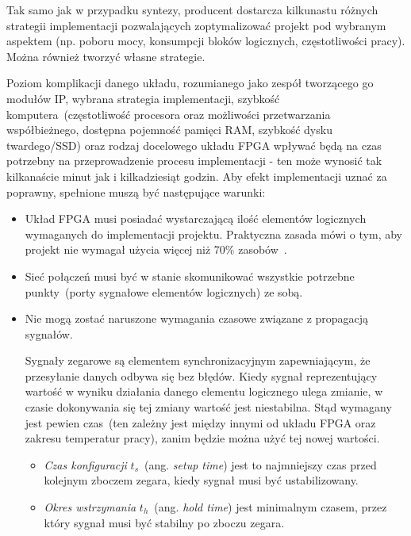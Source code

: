 Tak samo jak w przypadku syntezy, producent dostarcza kilkunastu różnych strategii implementacji pozwalających zoptymalizować projekt pod wybranym aspektem (np. poboru mocy, konsumpcji bloków logicznych, częstotliwości pracy). Można również tworzyć własne strategie.

Poziom komplikacji danego układu, rozumianego jako zespół tworzącego go modułów IP, wybrana strategia implementacji, szybkość komputera~(częstotliwość procesora oraz możliwości przetwarzania współbieżnego, dostępna pojemność pamięci RAM, szybkość dysku twardego/SSD) oraz rodzaj docelowego układu FPGA wpływać będą na czas potrzebny na przeprowadzenie procesu implementacji - ten może wynosić tak kilkanaście minut jak i kilkadziesiąt godzin. Aby efekt implementacji uznać za poprawny, spełnione muszą być następujące warunki:
\begin{itemize}
\item Układ FPGA musi posiadać wystarczającą ilość elementów logicznych wymaganych do implementacji projektu. Praktyczna zasada mówi o tym, aby projekt nie wymagał użycia więcej niż 70\% zasobów~\cite{Designing_with_Xilinx}.
\item Sieć połączeń musi być w stanie skomunikować wszystkie potrzebne punkty~(porty sygnałowe elementów logicznych) ze sobą. 
\item Nie mogą zostać naruszone wymagania czasowe związane z propagacją sygnałów. 

Sygnały zegarowe są elementem synchronizacyjnym zapewniającym, że przesyłanie danych odbywa się bez błędów. Kiedy sygnał reprezentujący wartość w wyniku działania danego elementu logicznego ulega zmianie, w czasie dokonywania się tej zmiany wartość jest niestabilna. Stąd wymagany jest pewien czas~(ten zależny jest między innymi od układu FPGA oraz zakresu temperatur pracy), zanim będzie można użyć tej nowej wartości. 
\begin{itemize}
\item \textit{Czas konfiguracji} $t_s$~(ang. \textit{setup time}) jest to najmniejszy czas przed kolejnym zboczem zegara, kiedy sygnał musi być ustabilizowany.
\item \textit{Okres wstrzymania} $t_h$~(ang. \textit{hold time}) jest minimalnym czasem, przez który sygnał musi być stabilny po zboczu zegara.
\end{itemize}



\end{itemize}
